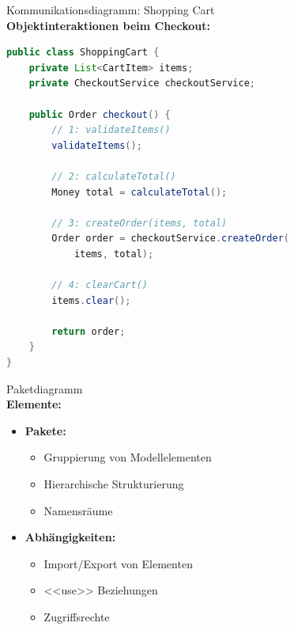 \begin{example2}{Kommunikationsdiagramm: Shopping Cart}\\
\textbf{Objektinteraktionen beim Checkout:}

\begin{lstlisting}[language=Java, style=basesmol]
public class ShoppingCart {
    private List<CartItem> items;
    private CheckoutService checkoutService;
    
    public Order checkout() {
        // 1: validateItems()
        validateItems();
        
        // 2: calculateTotal()
        Money total = calculateTotal();
        
        // 3: createOrder(items, total)
        Order order = checkoutService.createOrder(
            items, total);
            
        // 4: clearCart()
        items.clear();
        
        return order;
    }
}
\end{lstlisting}
\end{example2}

\begin{definition}{Paketdiagramm}\\
\textbf{Elemente:}
\begin{itemize}
    \item \textbf{Pakete:}
    \begin{itemize}
        \item Gruppierung von Modellelementen
        \item Hierarchische Strukturierung
        \item Namensräume
    \end{itemize}
    
    \item \textbf{Abhängigkeiten:}
    \begin{itemize}
        \item Import/Export von Elementen
        \item <<use>> Beziehungen
        \item Zugriffsrechte
    \end{itemize}
\end{itemize}
\end{definition}

